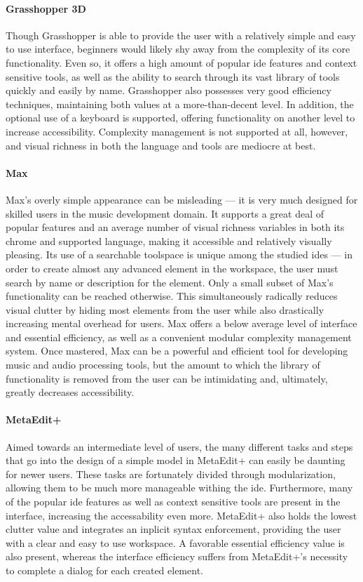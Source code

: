 \paragraph{Grasshopper 3D} Though Grasshopper is able to provide the user
with a relatively simple and easy to use interface, beginners would likely
shy away from the complexity of its core functionality. Even so, it offers
a high amount of popular \ac{ide} features and context sensitive tools, as
well as the ability to search through its vast library of tools quickly and
easily by name. Grasshopper also possesses very good efficiency techniques,
maintaining both values at a more-than-decent level. In addition, the
optional use of a keyboard is supported, offering functionality on another
level to increase accessibility. Complexity management is not supported at
all, however, and visual richness in both the language and tools are
mediocre at best.

\paragraph{Max} Max's overly simple appearance can be misleading --- it is
very much designed for skilled users in the music development domain. It
supports a great deal of popular features and an average number of visual
richness variables in both its chrome and supported language, making it
accessible and relatively visually pleasing. Its use of a searchable
toolspace is unique among the studied \acp{ide} --- in order to create
almost any advanced element in the workspace, the user must search by name
or description for the element. Only a small subset of Max's functionality
can be reached otherwise. This simultaneously radically reduces visual
clutter by hiding most elements from the user while also drastically
increasing mental overhead for users. Max offers a below average level of
interface and essential efficiency, as well as a convenient modular
complexity management system. Once mastered, Max can be a powerful and
efficient tool for developing music and audio processing tools, but the
amount to which the library of functionality is removed from the user can
be intimidating and, ultimately, greatly decreases accessibility.

\paragraph{MetaEdit+} Aimed towards an intermediate level of users, the
many different tasks and steps that go into the design of a simple model in
MetaEdit+ can easily be daunting for newer users.  These tasks are
fortunately divided through modularization, allowing them to be much more
manageable withing the \ac{ide}. Furthermore, many of the popular \ac{ide}
features as well as context sensitive tools are present in the interface,
increasing the accessability even more. MetaEdit+ also holds the lowest
clutter value and integrates an inplicit syntax enforcement, providing the
user with a clear and easy to use workspace. A favorable essential
efficiency value is also present, whereas the interface efficiency suffers
from MetaEdit+'s necessity to complete a dialog for each created element.

